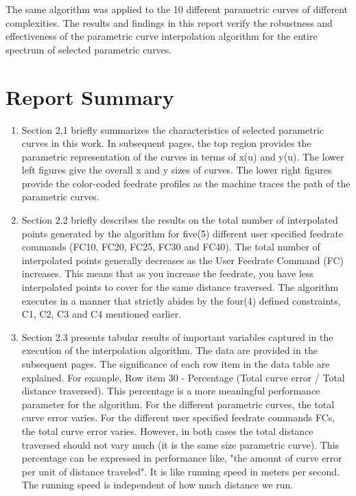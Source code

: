 The same algorithm was applied to the 10 different parametric curves of different complexities. The results and findings in this report verify the robustness and effectiveness of the parametric curve interpolation algorithm for the entire spectrum of selected parametric curves.
\vspace*{1\baselineskip}

\pagebreak
\section{Report Summary}

\begin{enumerate}
	\item Section 2.1 briefly summarizes the characteristics of selected parametric curves in this work. In subsequent pages, the top region provides the parametric representation of the curves in terms of x(u) and y(u). The lower left figures give the overall x and y sizes of curves. The lower right figures provide the color-coded feedrate profiles as the machine traces the path of the parametric curves.	
	
	\item Section 2.2 briefly describes the results on the total number of interpolated points generated by the algorithm for five(5) different user specified feedrate commands (FC10, FC20, FC25, FC30 and FC40). The total number of interpolated points generally decreases as the User Feedrate Command (FC) increases. This means that as you increase the feedrate, you have less interpolated points to cover for the same distance traversed. The algorithm executes in a manner that strictly abides by the four(4) defined constraints, C1, C2, C3 and C4 mentioned earlier.
	
	\item Section 2.3 presents tabular results of important variables captured in the execution of the interpolation algorithm. The data are provided in the subsequent pages. The significance of each row item in the data table are explained. For example, Row item 30 - Percentage (Total curve error / Total distance traversed). This percentage is a more meaningful performance parameter for the algorithm. For the different parametric curves, the total curve error varies. For the different user specified feedrate commands FCs, the total curve error varies. However, in both cases the total distance traversed should not vary much (it is the same size parametric curve). This percentage can be expressed in performance like, "the amount of curve error per unit of distance traveled". It is like running speed in meters per second. The running speed is independent of how much distance we run.
	

\end{enumerate}
